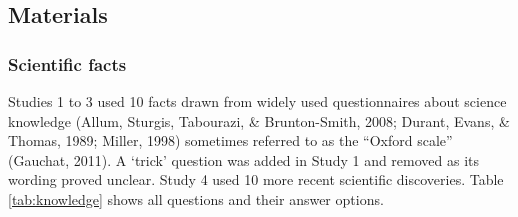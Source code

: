 \documentclass[
  doc,floatsintext]{apa6}
\begin{document}
\subsection{Materials}\label{materials-1}

\subsubsection{Scientific facts}\label{scientific-facts}

Studies 1 to 3 used 10 facts drawn from widely used questionnaires about science knowledge (Allum, Sturgis, Tabourazi, \& Brunton-Smith, 2008; Durant, Evans, \& Thomas, 1989; Miller, 1998) sometimes referred to as the ``Oxford scale'' (Gauchat, 2011). A `trick' question was added in Study 1 and removed as its wording proved unclear. Study 4 used 10 more recent scientific discoveries. Table \ref{tab:knowledge} shows all questions and their answer options.

\begingroup\fontsize{8}{10}\selectfont
\end{document}
